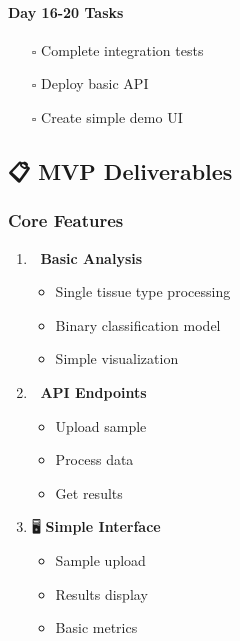 \begin{Shaded}
\begin{Highlighting}[]
\end{Highlighting}
\end{Shaded}

\paragraph{Day 16-20 Tasks}\label{day-16-20-tasks}

\begin{itemize}
\tightlist
\item[$\square$]
  Complete integration tests
\item[$\square$]
  Deploy basic API
\item[$\square$]
  Create simple demo UI
\end{itemize}

\subsection{📋 MVP Deliverables}\label{mvp-deliverables}

\subsubsection{Core Features}\label{core-features}

\begin{enumerate}
\def\labelenumi{\arabic{enumi}.}
\tightlist
\item
  🔬 \textbf{Basic Analysis}

  \begin{itemize}
  \tightlist
  \item
    Single tissue type processing
  \item
    Binary classification model
  \item
    Simple visualization
  \end{itemize}
\item
  🔌 \textbf{API Endpoints}

  \begin{itemize}
  \tightlist
  \item
    Upload sample
  \item
    Process data
  \item
    Get results
  \end{itemize}
\item
  🖥️ \textbf{Simple Interface}

  \begin{itemize}
  \tightlist
  \item
    Sample upload
  \item
    Results display
  \item
    Basic metrics
  \end{itemize}
\end{enumerate}

